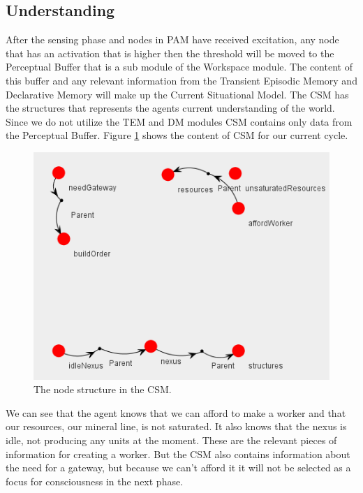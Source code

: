 \subsection{Understanding}
After the sensing phase and nodes in PAM have received excitation, any node that has an activation that is higher then the threshold will be moved to the Perceptual Buffer that is a sub module of the Workspace module. The content of this buffer and any relevant information from the Transient Episodic Memory and Declarative Memory will make up the Current Situational Model. The CSM has the structures that represents the agents current understanding of the world. Since we do not utilize the TEM and DM modules CSM contains only data from the Perceptual Buffer. Figure \ref{fig:csm} shows the content of CSM for our current cycle. 

\begin{figure}[h!tb]
\centering
\includegraphics[scale=1.0]{graphics/perceptual_buffer.png}
\caption{The node structure in the CSM.}
\label{fig:csm}
\end{figure}

We can see that the agent knows that we can afford to make a worker and that our resources, our mineral line, is not saturated. It also knows that the nexus is idle, not producing any units at the moment. These are the relevant pieces of information for creating a worker. But the CSM also contains information about the need for a gateway, but because we can't afford it it will not be selected as a focus for consciousness in the next phase.


